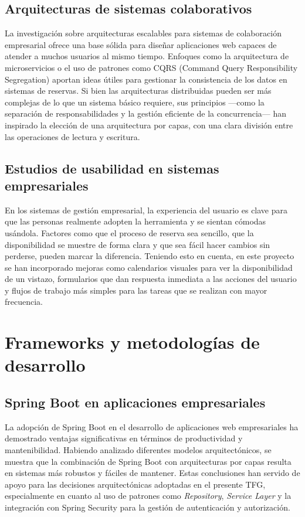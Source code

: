 \subsection{Arquitecturas de sistemas colaborativos}\label{arquitecturas-sistemas-colaborativos}
La investigación sobre arquitecturas escalables para sistemas de colaboración empresarial ofrece una base sólida para diseñar aplicaciones web capaces de atender a muchos usuarios al mismo tiempo. Enfoques como la arquitectura de microservicios o el uso de patrones como CQRS (Command Query Responsibility Segregation) aportan ideas útiles para gestionar la consistencia de los datos en sistemas de reservas.
Si bien las arquitecturas distribuidas pueden ser más complejas de lo que un sistema básico requiere, sus principios —como la separación de responsabilidades y la gestión eficiente de la concurrencia— han inspirado la elección de una arquitectura por capas, con una clara división entre las operaciones de lectura y escritura.\\

\subsection{Estudios de usabilidad en sistemas empresariales}\label{estudios-usuabilidad-sistemas-empresariales}
En los sistemas de gestión empresarial, la experiencia del usuario es clave para que las personas realmente adopten la herramienta y se sientan cómodas usándola. Factores como que el proceso de reserva sea sencillo, que la disponibilidad se muestre de forma clara y que sea fácil hacer cambios sin perderse, pueden marcar la diferencia.
Teniendo esto en cuenta, en este proyecto se han incorporado mejoras como calendarios visuales para ver la disponibilidad de un vistazo, formularios que dan respuesta inmediata a las acciones del usuario y flujos de trabajo más simples para las tareas que se realizan con mayor frecuencia.\\

\section{Frameworks y metodologías de desarrollo}\label{frameworks-metodologias-desarrollo}
\subsection{Spring Boot en aplicaciones empresariales}\label{spring-boot-aplicaciones-empresariales}
La adopción de Spring Boot en el desarrollo de aplicaciones web empresariales ha demostrado ventajas significativas en términos de productividad y mantenibilidad. Habiendo analizado diferentes modelos arquitectónicos, se muestra que la combinación de Spring Boot con arquitecturas por capas resulta en sistemas más robustos y fáciles de mantener.
Estas conclusiones han servido de apoyo para las decisiones arquitectónicas adoptadas en el presente TFG, especialmente en cuanto al uso de patrones como \emph{Repository}, \emph{Service Layer} y la integración con Spring Security para la gestión de autenticación y autorización.\\


